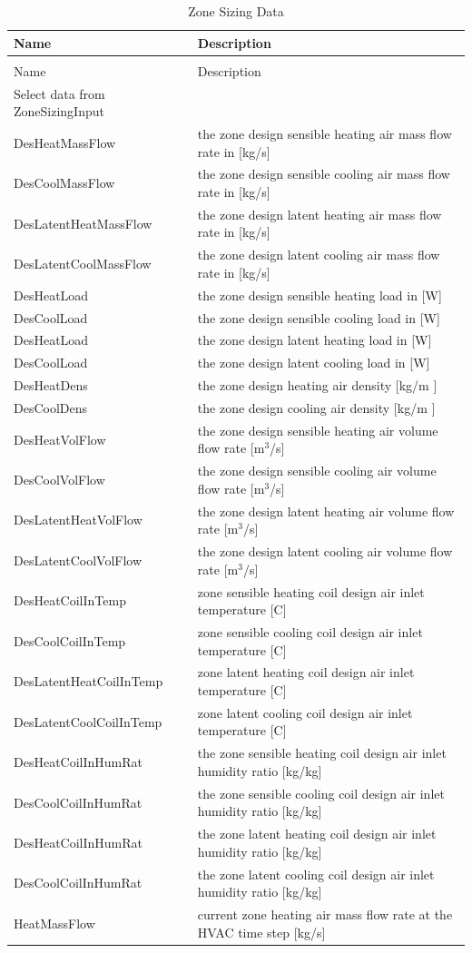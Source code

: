 \begin{longtable}[c]{p{1.85in}p{4.13in}}
\caption{Zone Sizing Data \label{table:zone-sizing-data}} \tabularnewline
\toprule
Name & Description \tabularnewline
\midrule
\endfirsthead

\caption[]{Zone Sizing Data} \tabularnewline
\toprule
Name & Description \tabularnewline
\midrule
\endhead

Select data from ZoneSizingInput &  \tabularnewline
DesHeatMassFlow & the zone design sensible heating air mass flow rate in [kg/s] \tabularnewline
DesCoolMassFlow & the zone design sensible cooling air mass flow rate in [kg/s] \tabularnewline
DesLatentHeatMassFlow & the zone design latent heating air mass flow rate in [kg/s] \tabularnewline
DesLatentCoolMassFlow & the zone design latent cooling air mass flow rate in [kg/s] \tabularnewline
DesHeatLoad & the zone design sensible heating load in [W] \tabularnewline
DesCoolLoad & the zone design sensible cooling load in [W] \tabularnewline
DesHeatLoad & the zone design latent heating load in [W] \tabularnewline
DesCoolLoad & the zone design latent cooling load in [W] \tabularnewline
DesHeatDens & the zone design heating air density [kg/m  ] \tabularnewline
DesCoolDens & the zone design cooling air density [kg/m  ] \tabularnewline
DesHeatVolFlow & the zone design sensible heating air volume flow rate [m\(^{3}\)/s] \tabularnewline
DesCoolVolFlow & the zone design sensible cooling air volume flow rate [m\(^{3}\)/s] \tabularnewline
DesLatentHeatVolFlow & the zone design latent heating air volume flow rate [m\(^{3}\)/s] \tabularnewline
DesLatentCoolVolFlow & the zone design latent cooling air volume flow rate [m\(^{3}\)/s] \tabularnewline
DesHeatCoilInTemp & zone sensible heating coil design air inlet temperature [C] \tabularnewline
DesCoolCoilInTemp & zone sensible cooling coil design air inlet temperature [C] \tabularnewline
DesLatentHeatCoilInTemp & zone latent heating coil design air inlet temperature [C] \tabularnewline
DesLatentCoolCoilInTemp & zone latent cooling coil design air inlet temperature [C] \tabularnewline
DesHeatCoilInHumRat & the zone sensible heating coil design air inlet humidity ratio [kg/kg] \tabularnewline
DesCoolCoilInHumRat & the zone sensible cooling coil design air inlet humidity ratio [kg/kg] \tabularnewline
DesHeatCoilInHumRat & the zone latent heating coil design air inlet humidity ratio [kg/kg] \tabularnewline
DesCoolCoilInHumRat & the zone latent cooling coil design air inlet humidity ratio [kg/kg] \tabularnewline
HeatMassFlow & current zone heating air mass flow rate at the HVAC time step [kg/s] \tabularnewline

\end{longtable}
